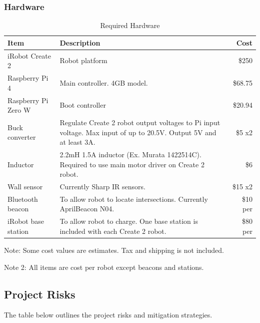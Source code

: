 \documentclass[12pt]{report}
\begin{document}
\subsubsection{Hardware}
\begin{table}[H]
\centering
    \caption{Required Hardware}
    \begin{tabular}{  l  p{8.5cm} r}
        \toprule
\textbf{Item}      
& \textbf{Description} 
& \textbf{Cost} 
\\\hline
iRobot Create 2
& Robot platform
& \$250
\\\hline
Raspberry Pi 4
& Main controller. 4GB model.
& \$68.75
\\\hline
Raspberry Pi Zero W
& Boot controller
& \$20.94
\\\hline
Buck converter
& Regulate Create 2 robot output voltages to Pi input voltage. Max input of up to 20.5V. Output 5V and at least 3A.
& ~\$5 x2
\\\hline
Inductor
& 2.2mH 1.5A inductor (Ex. Murata 1422514C). Required to use main motor driver on Create 2 robot.
& ~\$6
\\\hline
Wall sensor
& Currently Sharp IR sensors.
& \$15 x2
\\\hline
Bluetooth beacon
& To allow robot to locate intersections. Currently AprilBeacon N04.
& \$10 per
\\\hline
iRobot base station
& To allow robot to charge. One base station is included with each Create 2 robot.
& \$80 per
\\
        \bottomrule
    \end{tabular}
    \begin{tablenotes}
      \small
      \centering
      \item Note: Some cost values are estimates. Tax and shipping is not included.
      \item Note 2: All items are cost per robot except beacons and stations.
\end{tablenotes}
\end{table}

\subsection{Project Risks}
The table below outlines the project risks and mitigation strategies.
\end{document}
